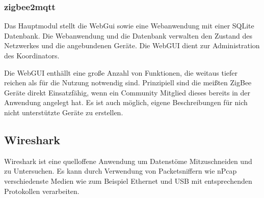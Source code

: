 \subsubsection{zigbee2mqtt}

Das Hauptmodul stellt die WebGui sowie eine Webanwendung mit einer SQLite Datenbank. Die Webanwendung und die Datenbank
verwalten den Zustand des Netzwerkes und die angebundenen Geräte. Die WebGUI dient zur Administration des Koordinators.


Die WebGUI enthällt eine große Anzahl von Funktionen, die weitaus tiefer reichen als für die Nutzung notwendig sind.
Prinzipiell sind die meißten ZigBee Geräte direkt Einsatzfähig, wenn ein Community Mitglied dieses bereits in der Anwendung
angelegt hat. Es ist auch möglich, eigene Beschreibungen für nich nicht unterstützte Geräte zu erstellen.


\subsection{Wireshark}

Wireshark ist eine quelloffene Anwendung um Datenstöme Mitzuschneiden und zu Untersuchen. Es kann durch Verwendung
von Packetsniffern wie nPcap verschiedenste Medien wie zum Beispiel Ethernet und USB mit entsprechenden Protokollen
verarbeiten.
